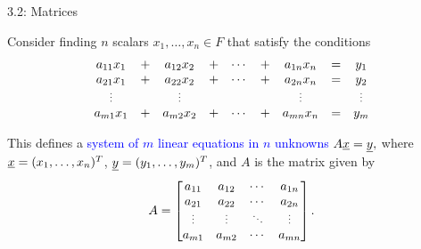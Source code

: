 \documentclass[10pt,letterpaper,english]{beamer}
\begin{document}
\begin{frame}{3.2: Matrices}

Consider finding $n$ scalars $x_1, \ldots, x_n \in F$ that satisfy the conditions \vspace{-0.5mm}
\begin{equation*} \begin{array}{ccccccccc}
a_{11} x_1 & + & a_{12} x_2 & + & \cdots & + & a_{1n} x_n & = & y_1 \\
a_{21} x_1 & + & a_{22} x_2 & + & \cdots & + & a_{2n} x_n & = & y_2 \\
\scalebox{0.75}{\vdots} & & \scalebox{0.75}{\vdots}  & & & & \scalebox{0.75}{\vdots} & & \scalebox{0.75}{\vdots} \\
a_{m1} x_1 & + & a_{m2} x_2 & + & \cdots & + & a_{mn} x_n & = & y_m
\end{array}
\end{equation*}

This defines a \textcolor{blue}{system of $m$ linear equations in $n$ unknowns $A \underline{x} = \underline{y},$}
where
$\underline{x} = (x_1, \ldots, x_n)^T$, 
$\underline{y} = (y_1, \ldots, y_m)^T$, and
$A$ is the matrix given by
\begin{equation*}
A = \begin{bmatrix}
a_{11} & a_{12} & \cdots & a_{1n} \\
a_{21} & a_{22} & \cdots & a_{2n} \\
\scalebox{0.75}{\vdots} & \scalebox{0.75}{\vdots} & \scalebox{0.75}{$\ddots$} & \scalebox{0.75}{\vdots} \\
a_{m1} & a_{m2} & \cdots & a_{mn}
\end{bmatrix}.
\end{equation*}
\vspace{-2mm}

\end{frame}
\end{document}

